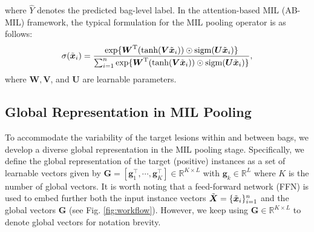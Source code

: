 \documentclass[runningheads]{llncs}
\begin{document}
where $\hat{Y}$ denotes the predicted bag-level label.
In the attention-based MIL (AB-MIL) \cite{ilse2018attention} framework, the typical formulation for the MIL pooling operator is as follows:
\begin{equation}
    \sigma(\Tilde{\boldsymbol{x}}_i) = \frac{\exp\{\boldsymbol{W}^\mathrm{T} (\text{tanh}(\boldsymbol{V} \Tilde{\boldsymbol{x}}_i)) \odot \text{sigm}(\boldsymbol{U}\Tilde{\boldsymbol{x}}_i) \}}{\sum_{i=1}^{n} \exp\{\boldsymbol{W}^\mathrm{T} (\text{tanh}(\boldsymbol{V} \Tilde{\boldsymbol{x}}_i)) \odot \text{sigm}(\boldsymbol{U}\Tilde{\boldsymbol{x}}_i) \}},
\label{eqn:abmil}
\end{equation}
where $\boldsymbol{W}, \boldsymbol{V}$, and $\boldsymbol{U}$ are learnable parameters. 

\subsection{Global Representation in MIL Pooling}
\label{sec:grmp}

To accommodate the variability of the target lesions within and between bags, we develop a diverse global representation in the MIL pooling stage. Specifically, we define the global representation of the target (positive) instances as a set of learnable vectors given by 
$\boldsymbol{G} = [\boldsymbol{g}_1^\top, \cdots, \boldsymbol{g}_K^\top ]\in \mathbb{R}^{K \times L}$
with $\boldsymbol{g}_k \in \mathbb{R}^{L}$ where $K$ is the number of global vectors. It is worth noting that a feed-forward network (FFN) is used to embed further both the input instance vectors $\Tilde{\boldsymbol{X}}=\{\Tilde{\boldsymbol{x}}_i\}_{i=1}^{n}$ and the global vectors $\boldsymbol{G}$ (see Fig. \ref{fig:workflow}). However, we keep using $\boldsymbol{G}\in \mathbb{R}^{K \times L}$ to denote global vectors for notation brevity.   

\end{document}
